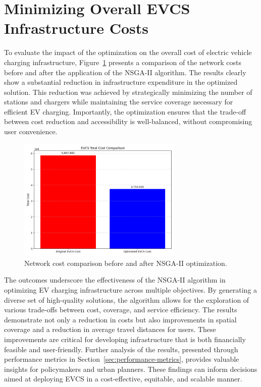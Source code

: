 \section{Minimizing Overall EVCS Infrastructure Costs}

To evaluate the impact of the optimization on the overall cost of electric vehicle charging infrastructure, Figure~\ref{fig:network_cost_comparison} presents a comparison of the network costs before and after the application of the NSGA-II algorithm. The results clearly show a substantial reduction in infrastructure expenditure in the optimized solution. This reduction was achieved by strategically minimizing the number of stations and chargers while maintaining the service coverage necessary for efficient EV charging. Importantly, the optimization ensures that the trade-off between cost reduction and accessibility is well-balanced, without compromising user convenience.

\clearpage

\begin{figure}[h!]
\centering
\includegraphics[width=0.7\textwidth]{../Figures/plot_EVCS_cost.png}
\caption{Network cost comparison before and after NSGA-II optimization.}
\label{fig:network_cost_comparison}
\end{figure}

The outcomes underscore the effectiveness of the NSGA-II algorithm in optimizing EV charging infrastructure across multiple objectives. By generating a diverse set of high-quality solutions, the algorithm allows for the exploration of various trade-offs between cost, coverage, and service efficiency. The results demonstrate not only a reduction in costs but also improvements in spatial coverage and a reduction in average travel distances for users. These improvements are critical for developing infrastructure that is both financially feasible and user-friendly. Further analysis of the results, presented through performance metrics in Section~\ref{sec:performance-metrics}, provides valuable insights for policymakers and urban planners. These findings can inform decisions aimed at deploying EVCS in a cost-effective, equitable, and scalable manner.


